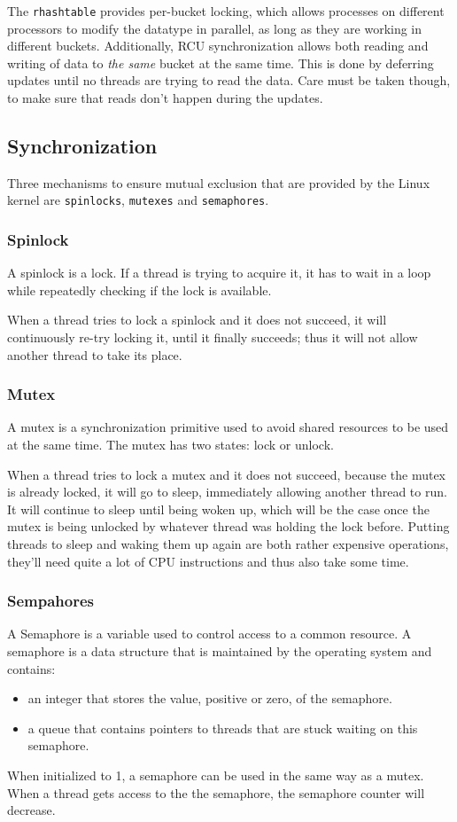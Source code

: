 \documentclass[final,a4paper]{article}
\begin{document}
The \texttt{rhashtable} provides per-bucket locking, which allows processes
on different processors to modify the datatype in parallel, as long as they are
working in different buckets. Additionally, RCU synchronization allows both
reading and writing of data to \emph{the same} bucket at the same time. This is
done by deferring updates until no threads are trying to read the data. Care
must be taken though, to make sure that reads don't happen during the updates.

\subsection{Synchronization}
Three mechanisms to ensure mutual exclusion that are provided by the Linux
kernel are \texttt{spinlocks}, \texttt{mutexes} and \texttt{semaphores}.

\subsubsection*{Spinlock}
A spinlock is a lock. If a thread is trying to acquire it, it has to wait in a
loop while repeatedly checking if the lock is available.

When a thread tries to lock a spinlock and it does not succeed, it will
continuously re-try locking it, until it finally succeeds; thus it will not
allow another thread to take its place.

\subsubsection*{Mutex}
A mutex is a synchronization primitive used to avoid shared resources to be used
at the same time. The mutex has two states: lock or unlock.

When a thread tries to lock a mutex and it does not succeed, because the mutex
is already locked, it will go to sleep, immediately allowing another thread to
run. It will continue to sleep until being woken up, which will be the case
once the mutex is being unlocked by whatever thread was holding the lock before.
Putting threads to sleep and waking them up again are both rather expensive
operations, they'll need quite a lot of CPU instructions and thus also take some
time.

\subsubsection*{Sempahores}
A Semaphore is a variable used to control access to a common resource. A
semaphore is a data structure that is maintained by the operating system and
contains:
\begin{itemize}
  \setlength\itemsep{-0.5em}
  \item an integer that stores the value, positive or zero, of the semaphore.
  \item a queue that contains pointers to threads that are stuck waiting on this
        semaphore.
\end{itemize}
When initialized to 1, a semaphore can be used in the same way as a mutex.
When a thread gets access to the the semaphore, the semaphore counter will
decrease. 
\end{document}

